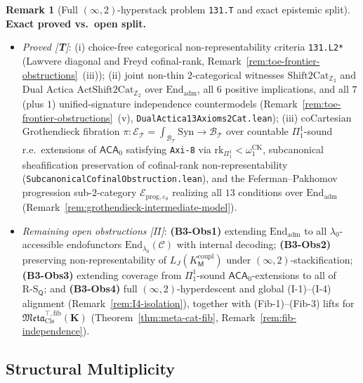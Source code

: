 \documentclass[11pt]{article}
\theoremstyle{plain}
\theoremstyle{definition}
\newtheorem{remark}[theorem]{Remark}
\newcommand{\RS}{\mathrm{R\text{-}S}}
\newcommand{\cC}{\mathcal{C}}
\newcommand{\Meta}{\mathfrak{Meta}}
\newcommand{\Syn}{\mathrm{Syn}}
\begin{document}
\begin{remark}[Full $(\infty,2)$-hyperstack problem \texttt{131.T} and exact epistemic split]
\medskip\noindent\textbf{Exact proved vs.\ open split.}
\begin{itemize}[nosep]
\item \emph{Proved \textup{[\textbf{T}]}}:
  (i) choice-free categorical non-representability criteria \texttt{131.L2*} (Lawvere diagonal and Freyd cofinal-rank, Remark~\ref{rem:toe-frontier-obstructions}~(iii));
  (ii) joint non-thin $2$-categorical witnesses $\mathrm{Shift2Cat}_{\mathbb{Z}_2}$ and Dual Actica $\mathrm{ActShift2Cat}_{\mathbb{Z}_2}$ over $\mathrm{End}_{\mathrm{adm}}$, all $6$ positive implications, and all $7$ (plus $1$) unified-signature independence countermodels (Remark~\ref{rem:toe-frontier-obstructions}~(v), \texttt{DualActica13Axioms2Cat.lean});
  (iii) coCartesian Grothendieck fibration $\pi : \mathcal{E}_{\mathcal{T}} = \int_{\mathcal{B}_{\mathcal{T}}} \Syn \to \mathcal{B}_{\mathcal{T}}$ over countable $\Pi_1^1$-sound r.e.\ extensions of $\mathsf{ACA}_0$ satisfying \texttt{Axi-8} via $\mathrm{rk}_{\Pi_1^1} < \omega_1^{\mathrm{CK}}$, subcanonical sheafification preservation of cofinal-rank non-representability (\texttt{SubcanonicalCofinalObstruction.lean}), and the Feferman--Pakhomov progression sub-$2$-category $\mathcal{E}_{\mathrm{prog}, \varepsilon_0}$ realizing all $13$ conditions over $\mathrm{End}_{\mathrm{adm}}$ (Remark~\ref{rem:grothendieck-intermediate-model}).
\item \emph{Remaining open obstructions \textup{[\textbf{$\Pi$}]}}: \textbf{(B3-Obs1)} extending $\mathrm{End}_{\mathrm{adm}}$ to all $\lambda_0$-accessible endofunctors $\mathrm{End}_{\lambda_0}(\cC)$ with internal decoding; \textbf{(B3-Obs2)} preserving non-representability of $L_J(K_{\mathsf{M}}^{\mathrm{coupl}})$ under $(\infty,2)$-stackification; \textbf{(B3-Obs3)} extending coverage from $\Pi_1^1$-sound $\mathsf{ACA}_0$-extensions to all of $\RS_{\mathsf{Q}}$; and \textbf{(B3-Obs4)} full $(\infty,2)$-hyperdescent and global \textup{(I-1)--(I-4)} alignment (Remark~\ref{rem:I4-isolation}), together with \textup{(Fib-1)--(Fib-3)} lifts for $\Meta_{\mathrm{Cls}}^{\top,\mathrm{fib}}(\mathbf{K})$ (Theorem~\ref{thm:meta-cat-fib}, Remark~\ref{rem:fib-independence}).
\end{itemize}
\end{remark}

\subsection{Structural Multiplicity}
\end{document}

